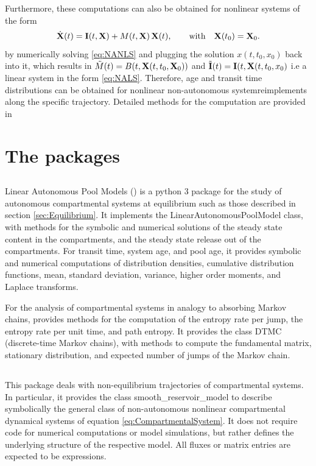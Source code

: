 Furthermore, these computations can also be obtained for nonlinear systems of the form
\begin{equation} \label{eq:NANLS}
\dot{\mathbf{X}}(t) = \mathbf{I}(t, \mathbf{X}) + M(t, \mathbf{X}) \, \mathbf{X}(t), \qquad  \mathrm{with} \quad \mathbf{X}(t_0) = \mathbf{X}_0.
\end{equation}
by numerically solving \eqref{eq:NANLS} and plugging the solution $x(t, t_0,
x_0)$ back into it, which results in $\tilde{M}(t)=B(t, \mathbf{X}(t, t_0,\mathbf{X}_0))$ and
$\tilde{\mathbf{I}}(t)=\mathbf{I}(t,\mathbf{X}(t, t_0,x_0)$  i.e a linear system in the form
\eqref{eq:NALS}. 
Therefore,  age and transit time
distributions can be obtained for nonlinear non-autonomous systemreimplements along the
specific trajectory. Detailed methods for the computation are provided in
\citet{Metzler2018PNAS}

\section{The \python{} packages}
\label{sec:PythonPackages}
\subsection{\LAPM{}}
Linear Autonomous Pool Models (\LAPM{}) is a python 3 package for the study of autonomous compartmental systems at equilibrium such as those described in section \ref{sec:Equilibrium}. 
It implements the LinearAutonomousPoolModel class, with methods for the
symbolic and numerical solutions of the steady state content in the compartments, and the steady state release out of the compartments. For transit time, system age, and pool age, it provides symbolic and numerical computations of distribution densities, cumulative distribution functions, mean, standard deviation,           variance, higher order moments, and Laplace transforms. 

For the analysis of compartmental systems in analogy to absorbing Markov chains, \LAPM{} provides methods for the computation of the entropy rate per jump, the entropy rate per unit time, and path entropy. It provides the class DTMC (discrete-time Markov chains), with methods to compute the fundamental matrix, stationary distribution, and expected number of jumps of the Markov chain.

\subsection{\CompartmentalSystems{}}
This package deals with non-equilibrium trajectories of compartmental systems.
In particular, it provides the class smooth\_reservoir\_model to describe
symbolically the general class of non-autonomous nonlinear compartmental
dynamical systems of equation \eqref{eq:CompartmentalSystem}. It does not
require code for numerical computations or model simulations, but rather defines the underlying structure of the respective model. 
All fluxes or matrix entries are expected to be \sympy{} 
expressions. 

